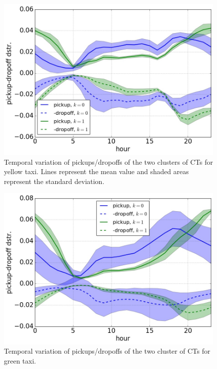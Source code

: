 \documentclass[journal]{IEEEtran}
\begin{document}
\begin{figure}[!t] 
  \centering
  \includegraphics[width=1.0\columnwidth]{./figs/curve_yellow.jpg}
  \caption{Temporal variation of pickups/dropoffs of the two clusters of CTs for
  yellow taxi. Lines represent the mean value and shaded areas represent the
  standard deviation.}
  \label{fig:curve_yellow}
\end{figure}
\begin{figure}[!t] 
  \centering
  \includegraphics[width=1.0\columnwidth]{./figs/curve_green.jpg}
  \caption{Temporal variation of pickups/dropoffs of the two cluster of CTs for green taxi.}
  \label{fig:curve_green}
\end{figure}
\end{document}
